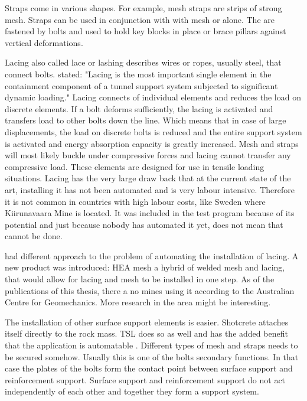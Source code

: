Straps come in various shapes. For example, mesh straps are strips of strong mesh. Straps can be used in conjunction with with mesh or alone. The are fastened by bolts and used to hold key blocks in place or brace pillars against vertical deformations. \autocite[577]{sme11} 

Lacing also called lace or lashing describes wires or ropes, usually steel, that connect bolts. %
 \textcite{Ortlepp97} stated: "Lacing is the most important single element in the containment component of a tunnel support system subjected to significant dynamic loading." 
 Lacing connects of individual elements and reduces the load on discrete elements. If a bolt deforms sufficiently, the lacing is activated and transfers load to other bolts down the line. Which means that in case of large displacements, the load on discrete bolts is reduced and the entire support system is activated and energy absorption capacity is greatly increased.\autocite[240]{Potvin10} \autocite[3]{guler01}
 Mesh and straps will most likely buckle under compressive forces and lacing cannot transfer any compressive load. These elements are designed for use in tensile loading situations. \autocite[3]{Villa14}
  Lacing has the very large draw back that at the current state of the art, installing it has not been automated and is very labour intensive. \autocite{sme11} Therefore it is not common in countries with high labour costs, like Sweden where Kiirunavaara Mine is located. It was included in the test program because of its potential and just because nobody has automated it yet, does not mean that cannot be done.
 
\textcite{hea09} had different approach to the problem of automating the installation of lacing. A new product was introduced: HEA mesh a hybrid of welded mesh and lacing, that would allow for lacing and mesh to be installed in one step. As of the publications of this thesis, there a no mines using it according to the Australian Centre for Geomechanics. More research in the area might be interesting.

The installation of other surface support elements is easier.
Shotcrete attaches itself directly to the rock mass. TSL does so as well and has the added benefit that the application is automatable \autocite[241]{boeg14}. Different types of mesh and straps needs to be secured somehow. Usually this is one of the bolts secondary functions. In that case the plates of the bolts form the contact point between surface support and reinforcement support. 
Surface support and reinforcement support do not act independently of each other and together they form a support system.

